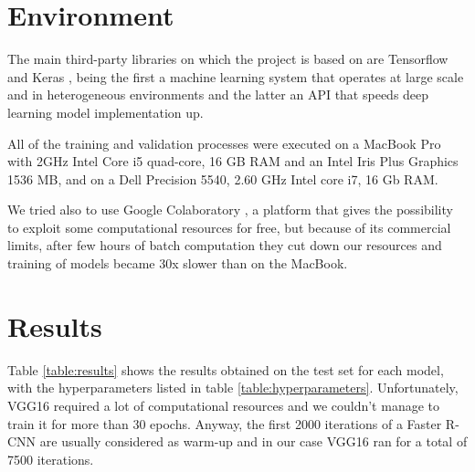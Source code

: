 \documentclass[a4paper,10pt]{report}
\begin{document}
\section{Environment}
The main third-party libraries on which the project is based on are Tensorflow \cite{tensorflow} and Keras \cite{keras}, being the first a machine learning system that operates at large scale and in heterogeneous environments and the latter an API that speeds deep learning model implementation up.

All of the training and validation processes were executed on a MacBook Pro with 2GHz Intel Core i5 quad-core, 16 GB RAM and an Intel Iris Plus Graphics 1536 MB, and on a Dell Precision 5540, 2.60 GHz Intel core i7, 16 Gb RAM.

We tried also to use Google Colaboratory \cite{colab}, a platform that gives the possibility to exploit some computational resources for free, but because of its commercial limits, after few hours of batch computation they cut down our resources and training of models became 30x slower than on the MacBook.

\section{Results}\label{sec:results}
Table \ref{table:results} shows the results obtained on the test set for each model, with the hyperparameters listed in table \ref{table:hyperparameters}.
Unfortunately, VGG16 required a lot of computational resources and we couldn't manage to train it for more than 30 epochs. Anyway, the first 2000 iterations of a Faster R-CNN are usually considered as warm-up \cite{warm-up} and in our case VGG16 ran for a total of 7500 iterations.
\end{document}
